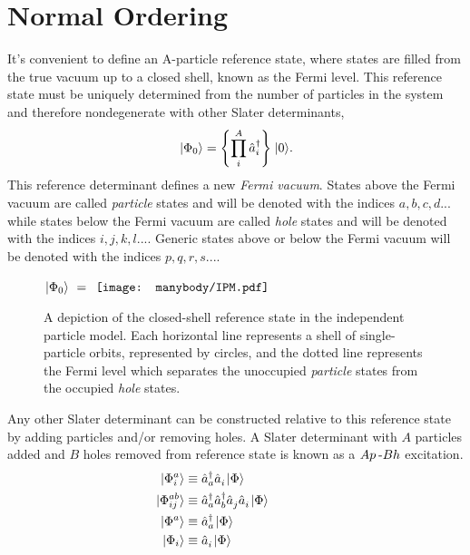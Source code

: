 \documentclass[thesis.tex]{subfiles}
\begin{document}
\section{Normal Ordering}
It's convenient to define an A-particle reference state, where states are filled from the true vacuum up to a closed shell, known as the Fermi level.  This reference state must be uniquely determined from the number of particles in the system and therefore nondegenerate with other Slater determinants,
\begin{equation}
  \hspace{1pt}\lvert \Phi_{0} \rangle = \left\{\prod_{i}^{A}\hat{a}_{i}^{\dagger}\right\}\hspace{1pt}\lvert 0 \rangle.
\end{equation}
This reference determinant defines a new \textit{Fermi vacuum}. States above the Fermi vacuum are called \textit{particle} states and will be denoted with the indices $a,b,c,d...$ while states below the Fermi vacuum are called \textit{hole} states and will be denoted with the indices $i,j,k,l...$. Generic states above or below the Fermi vacuum will be denoted with the indices $p,q,r,s...$.

\begin{figure}
  \centering
  \mbox{{\large $\hspace{1pt}\lvert \Phi_{0} \rangle\ =\ $}} $\vcenter{\hbox{\texttt{[image: manybody/IPM.pdf]}}}$
  \caption{A depiction of the closed-shell reference state in the independent particle model.  Each horizontal line represents a shell of single-particle orbits, represented by circles, and the dotted line represents the Fermi level which separates the unoccupied \textit{particle} states from the occupied \textit{hole} states.}
  \label{fig:reference_state}
\end{figure}

Any other Slater determinant can be constructed relative to this reference state by adding particles and/or removing holes.  A Slater determinant with $A$ particles added and $B$ holes removed from reference state is known as a $Ap\hspace{2pt}\text{-}Bh$ excitation.
\begin{align}
  \hspace{1pt}\lvert \Phi^{a}_{i} \rangle &\equiv \hat{a}_{a}^{\dagger}\hat{a}_{i}^{}\hspace{1pt}\lvert \Phi \rangle \hspace{2cm} \notag \\
  \hspace{1pt}\lvert \Phi^{ab}_{ij} \rangle &\equiv \hat{a}_{a}^{\dagger}\hat{a}_{b}^{\dagger}\hat{a}_{j}^{}\hat{a}_{i}^{}\hspace{1pt}\lvert \Phi \rangle \notag \\
  \hspace{1pt}\lvert \Phi^{a} \rangle &\equiv \hat{a}_{a}^{\dagger}\hspace{1pt}\lvert \Phi \rangle \notag \\
  \hspace{1pt}\lvert \Phi_{i} \rangle &\equiv \hat{a}_{i}^{}\hspace{1pt}\lvert \Phi \rangle
\end{align}
\end{document}
